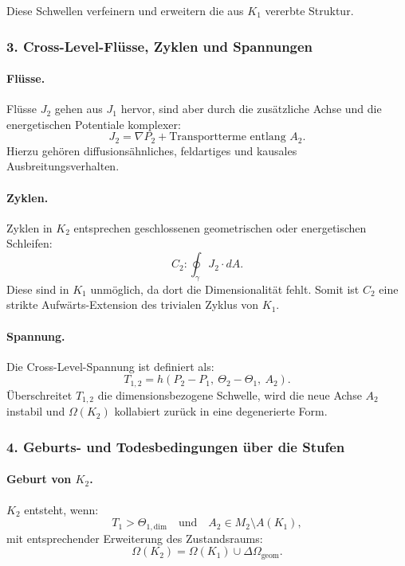 Diese Schwellen verfeinern und erweitern die aus $K_1$ vererbte Struktur.

\subsubsection{3. Cross-Level-Flüsse, Zyklen und Spannungen}

\paragraph{Flüsse.}
Flüsse $J_2$ gehen aus $J_1$ hervor, sind aber durch die zusätzliche Achse und
die energetischen Potentiale komplexer:
\[
J_2 = \nabla P_2 + \text{Transportterme entlang } A_2.
\]
Hierzu gehören diffusionsähnliches, feldartiges und kausales Ausbreitungsverhalten.

\paragraph{Zyklen.}
Zyklen in $K_2$ entsprechen geschlossenen geometrischen oder energetischen
Schleifen:
\[
C_2 : \oint_{\gamma} J_2 \cdot dA.
\]
Diese sind in $K_1$ unmöglich, da dort die Dimensionalität fehlt.
Somit ist $C_2$ eine strikte Aufwärts-Extension des trivialen Zyklus von $K_1$.

\paragraph{Spannung.}
Die Cross-Level-Spannung ist definiert als:
\[
T_{1,2} = h(P_2 - P_1,\ \Theta_2 - \Theta_1,\ A_2).
\]
Überschreitet $T_{1,2}$ die dimensionsbezogene Schwelle, wird die neue Achse
$A_2$ instabil und $\Omega(K_2)$ kollabiert zurück in eine degenerierte Form.

\subsubsection{4. Geburts- und Todesbedingungen über die Stufen}

\paragraph{Geburt von \texorpdfstring{$K_2$}{K_2}.}
$K_2$ entsteht, wenn:
\[
T_1 > \Theta_{1,\mathrm{dim}}
\quad \text{und} \quad
A_2 \in M_2 \setminus A(K_1),
\]
mit entsprechender Erweiterung des Zustandsraums:
\[
\Omega(K_2) = \Omega(K_1) \cup \Delta\Omega_{\mathrm{geom}}.
\]

